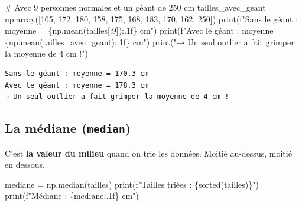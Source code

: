 \documentclass[
  french,
  11pt,
  a4paper,
]{scrbook}
\newenvironment{Shaded}{}{}
\newcommand{\BuiltInTok}[1]{\textcolor[rgb]{0.84,0.23,0.29}{#1}}
\newcommand{\CommentTok}[1]{\textcolor[rgb]{0.42,0.45,0.49}{#1}}
\newcommand{\DecValTok}[1]{\textcolor[rgb]{0.00,0.36,0.77}{#1}}
\newcommand{\NormalTok}[1]{\textcolor[rgb]{0.14,0.16,0.18}{#1}}
\newcommand{\OperatorTok}[1]{\textcolor[rgb]{0.14,0.16,0.18}{#1}}
\newcommand{\SpecialCharTok}[1]{\textcolor[rgb]{0.00,0.36,0.77}{#1}}
\newcommand{\SpecialStringTok}[1]{\textcolor[rgb]{0.01,0.18,0.38}{#1}}
\newcommand{\StringTok}[1]{\textcolor[rgb]{0.01,0.18,0.38}{#1}}
\begin{document}
\begin{Shaded}
\begin{Highlighting}[]
\CommentTok{\# Avec 9 personnes normales et un géant de 250 cm}
\NormalTok{tailles\_avec\_geant }\OperatorTok{=}\NormalTok{ np.array([}\DecValTok{165}\NormalTok{, }\DecValTok{172}\NormalTok{, }\DecValTok{180}\NormalTok{, }\DecValTok{158}\NormalTok{, }\DecValTok{175}\NormalTok{, }\DecValTok{168}\NormalTok{, }\DecValTok{183}\NormalTok{, }\DecValTok{170}\NormalTok{, }\DecValTok{162}\NormalTok{, }\DecValTok{250}\NormalTok{])}
\BuiltInTok{print}\NormalTok{(}\SpecialStringTok{f"Sans le géant : moyenne = }\SpecialCharTok{\{}\NormalTok{np}\SpecialCharTok{.}\NormalTok{mean(tailles[:}\DecValTok{9}\NormalTok{])}\SpecialCharTok{:.1f\}}\SpecialStringTok{ cm"}\NormalTok{)}
\BuiltInTok{print}\NormalTok{(}\SpecialStringTok{f"Avec le géant : moyenne = }\SpecialCharTok{\{}\NormalTok{np}\SpecialCharTok{.}\NormalTok{mean(tailles\_avec\_geant)}\SpecialCharTok{:.1f\}}\SpecialStringTok{ cm"}\NormalTok{)}
\BuiltInTok{print}\NormalTok{(}\StringTok{"→ Un seul outlier a fait grimper la moyenne de 4 cm !"}\NormalTok{)}
\end{Highlighting}
\end{Shaded}

\begin{verbatim}
Sans le géant : moyenne = 170.3 cm
Avec le géant : moyenne = 178.3 cm
→ Un seul outlier a fait grimper la moyenne de 4 cm !
\end{verbatim}

\subsection{\texorpdfstring{La médiane
(\texttt{median})}{La médiane (median)}}\label{la-muxe9diane-median}

C'est \textbf{la valeur du milieu} quand on trie les données. Moitié
au-dessus, moitié en dessous.

\begin{Shaded}
\begin{Highlighting}[]
\NormalTok{mediane }\OperatorTok{=}\NormalTok{ np.median(tailles)}
\BuiltInTok{print}\NormalTok{(}\SpecialStringTok{f"Tailles triées : }\SpecialCharTok{\{}\BuiltInTok{sorted}\NormalTok{(tailles)}\SpecialCharTok{\}}\SpecialStringTok{"}\NormalTok{)}
\BuiltInTok{print}\NormalTok{(}\SpecialStringTok{f"Médiane : }\SpecialCharTok{\{}\NormalTok{mediane}\SpecialCharTok{:.1f\}}\SpecialStringTok{ cm"}\NormalTok{)}
\end{Highlighting}
\end{Shaded}
\end{document}
